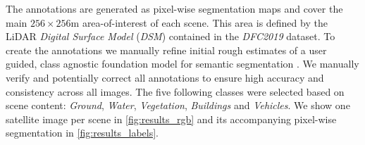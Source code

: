 The annotations are generated as pixel-wise segmentation maps and cover the main $256 \times 256$m area-of-interest of each scene. This area is defined by the LiDAR \emph{Digital Surface Model} (\emph{DSM}) contained in  the \emph{DFC2019} \cite{dfc2019} dataset. 
To create the annotations we manually refine initial rough estimates of a user guided, class agnostic foundation model for semantic segmentation \cite{sam}. We manually verify and potentially correct all annotations to ensure high accuracy and consistency across all images. 
The five following classes were selected based on scene content:
\emph{Ground}, \emph{Water}, \emph{Vegetation}, \emph{Buildings} and \emph{Vehicles}.
We show one satellite image per scene in \cref{fig:results_rgb} and its accompanying pixel-wise segmentation in \cref{fig:results_labels}.

